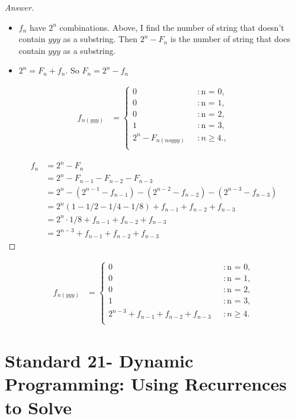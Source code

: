 \documentclass[11pt]{article}
\theoremstyle{definition}
\theoremstyle{definition}
\theoremstyle{definition}
\begin{document}
\begin{proof}[Answer]
\begin{itemize}
\item $f_n$ have $2^n$ combinations. Above, I find the number of string that doesn't contain $yyy$ as a substring.  Then $2^n- F_n$ is the number of string that does contain $yyy$ as a substring.
\item $2^n = F_n + f_n$. So $ F_n = 2^n - f_n$
\end{itemize}
\begin{align*}
f_{n(yyy)} &= \begin{cases} \text{0} & : \text{n = 0}, \\ 
\text{0} & : \text{n = 1},\\
\text{0} & : \text{n = 2},\\
\text{1} & : \text{n = 3},\\
\text{$2^n - F_{n(noyyy)}$ } & : \text{$n \geq 4$}.,\\
\end{cases}
\end{align*}

\begin{align*}
f_n &= 2^n - F_n\\
&= 2^n - F_{n-1}- F_{n-2}- F_{n-3}\\
&= 2^n - (2^{n-1}-f_{n-1})- (2^{n-2}-f_{n-2})- (2^{n-3}-f_{n-3})\\
&= 2^n(1-1/2-1/4-1/8) + f_{n-1} + f_{n-2} + f_{n-3}\\
&= 2^n \cdot 1/8 + f_{n-1} + f_{n-2} + f_{n-3}\\
&= 2^{n-3}+ f_{n-1} + f_{n-2} + f_{n-3}
\end{align*}
\end{proof}

\begin{align*}
f_{n(yyy)} &= \begin{cases} \text{0} & : \text{n = 0}, \\ 
\text{0} & : \text{n = 1},\\
\text{0} & : \text{n = 2},\\
\text{1} & : \text{n = 3},\\
\text{$2^{n-3}+ f_{n-1} + f_{n-2} + f_{n-3}$ } & : \text{$n \geq 4$}.\\
\end{cases}
\end{align*}



\newpage
\section{Standard 21- Dynamic Programming: Using Recurrences to Solve}
\end{document}
